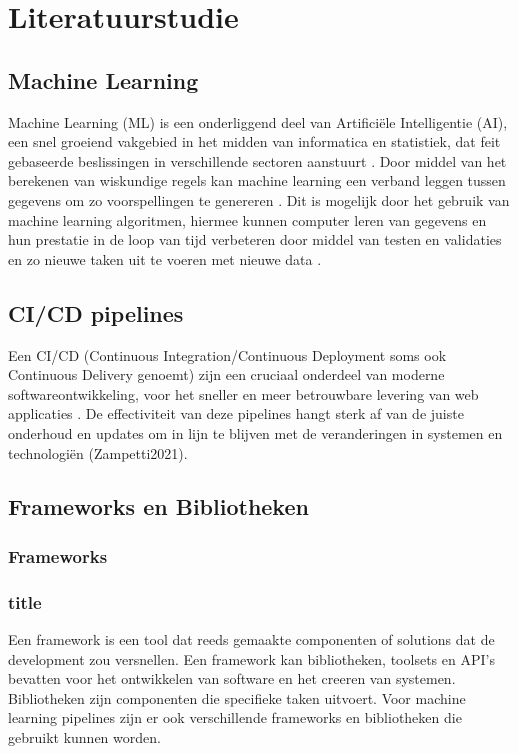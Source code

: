 
\section{Literatuurstudie}%
\label{sec:state-of-the-art}

\subsection{Machine Learning}
Machine Learning (ML) is een onderliggend deel van Artificiële Intelligentie (AI), een snel groeiend vakgebied in het midden van informatica en statistiek, dat feit gebaseerde beslissingen in verschillende sectoren aanstuurt \autocite{Jordan2015}.
Door middel van het berekenen van wiskundige regels kan machine learning een verband leggen tussen gegevens om zo voorspellingen te genereren \autocite{Cybenko2001}.
Dit is mogelijk door het gebruik van machine learning algoritmen, hiermee kunnen computer leren van gegevens en hun prestatie in de loop van tijd verbeteren door middel van testen en validaties en zo nieuwe taken uit te voeren met nieuwe data \autocite{Shaveta2023}.
\subsection{CI/CD pipelines}
Een CI/CD (Continuous Integration/Continuous Deployment soms ook Continuous Delivery genoemt) zijn een cruciaal onderdeel van moderne softwareontwikkeling, voor het sneller en meer betrouwbare levering van web applicaties \autocite{Singh2023}.
De effectiviteit van deze pipelines hangt sterk af van de juiste onderhoud en updates om in lijn te blijven met de veranderingen in systemen en technologiën (Zampetti2021).
\subsection{Frameworks en Bibliotheken}
\subsubsection{Frameworks}
\subsubsection{title}
Een framework is een tool dat reeds gemaakte componenten of solutions dat de development zou versnellen. Een framework kan bibliotheken, toolsets en API's bevatten voor het ontwikkelen van software en het creeren van systemen.
Bibliotheken zijn componenten die specifieke taken uitvoert. 
Voor machine learning pipelines zijn er ook verschillende frameworks en bibliotheken die gebruikt kunnen worden.

